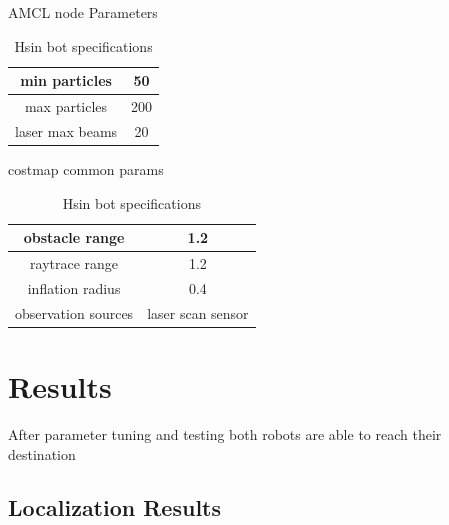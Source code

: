 \documentclass[10pt,journal,compsoc]{IEEEtran}
\begin{document}
\begin{table}[h]
 \begin{center}
       AMCL node Parameters\\
      \begin{tabular}{ |c|c| } 
       min particles & 50 \\
       \hline
       max particles & 200 \\
       \hline
       laser max beams & 20 \\
       \hline
      \end{tabular}
      \caption{Hsin bot specifications}
      \label{table:1}
      \end{center}
      \end{table}
\begin{table}[h]
 \begin{center}
 costmap common params\\
      \hline
      \begin{tabular}{ |c|c| }
       obstacle range & 1.2 \\
       \hline
       raytrace range & 1.2 \\
       \hline
       inflation radius & 0.4 \\
       \hline
       observation sources & laser scan sensor \\
       \hline
      \end{tabular}
      \caption{Hsin bot specifications}
      \label{table:1}
      \end{center}
      \end{table}  
    
\section{Results}
After parameter tuning and testing both robots are able to reach their destination

\subsection{Localization Results}
\end{document}
